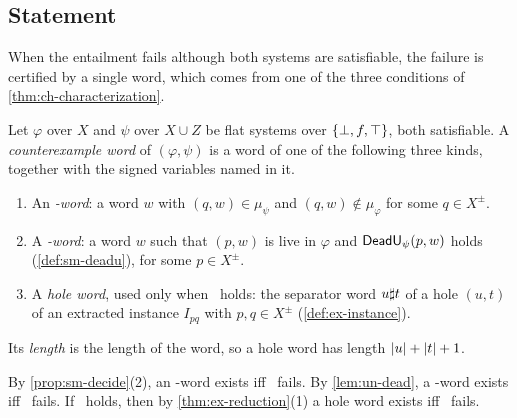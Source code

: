 \subsection{Statement}\label{sec:as-statement}

When the entailment fails although both systems are satisfiable, the failure
is certified by a single word, which comes from one of the three conditions
of \cref{thm:ch-characterization}.

\begin{definition}\label{def:as-certificate}
Let $\varphi$ over $X$ and $\psi$ over $X\cup Z$ be flat systems over $\{\bot,f,\top\}$,
both satisfiable. A \emph{counterexample word} of $(\varphi,\psi)$ is a word of
one of the following three kinds, together with the signed variables named
in it.
\begin{enumerate}[label=(C\arabic*),leftmargin=*]
\item An \emph{\CondI-word}: a word $w$ with
  $(q,w)\in\mu_\psi$ and $(q,w)\notin\mu_\varphi$ for some $q\in X^\pm$.
\item A \emph{\CondU-word}: a word $w$ such that $(p,w)$ is
  live in $\varphi$ and $\mathsf{DeadU}_\psi(p,w)$ holds (\cref{def:sm-deadu}), for
  some $p\in X^\pm$.
\item A \emph{hole word}, used only when \CondU\ holds: the
  separator word $u\sharp t$ of a hole $(u,t)$ of an extracted instance
  $I_{pq}$ with $p,q\in X^\pm$ (\cref{def:ex-instance}).
\end{enumerate}
Its \emph{length} is the length of the word, so a hole word has length
$\lvert u\rvert+\lvert t\rvert+1$.
\end{definition}

By \cref{prop:sm-decide}(2), an \CondI-word exists iff \CondI\ fails. By
\cref{lem:un-dead}, a \CondU-word exists iff \CondU\ fails. If \CondU\ holds,
then by \cref{thm:ex-reduction}(1) a hole word exists iff \CondII\ fails.

